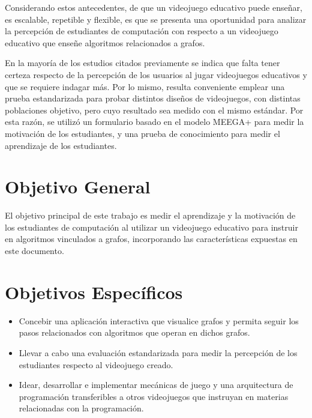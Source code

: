 Considerando estos antecedentes, de que un videojuego educativo puede enseñar, es escalable, repetible y flexible, es que se presenta una oportunidad para analizar la percepción de estudiantes de computación con respecto a un videojuego educativo que enseñe algoritmos relacionados a grafos.

En la mayoría de los estudios citados previamente se indica que falta tener certeza respecto de la percepción de los usuarios al jugar videojuegos educativos y que se requiere indagar más. Por lo mismo, resulta conveniente emplear una prueba estandarizada para probar distintos diseños de videojuegos, con distintas poblaciones objetivo, pero cuyo resultado sea medido con el mismo estándar. Por esta razón, se utilizó un formulario basado en el modelo MEEGA+ \cite{meegaplus} para medir la motivación de los estudiantes, y una prueba de conocimiento para medir el aprendizaje de los estudiantes.




\section{Objetivo General}

El objetivo principal de este trabajo es medir el aprendizaje y la motivación de los estudiantes de computación al utilizar un videojuego educativo para instruir en algoritmos vinculados a grafos, incorporando las características expuestas en este documento.


\section{Objetivos Específicos}

\begin{itemize}

\item Concebir una aplicación interactiva que visualice grafos y permita seguir los pasos relacionados con algoritmos que operan en dichos grafos.

\item Llevar a cabo una evaluación estandarizada para medir la percepción de los estudiantes respecto al videojuego creado.

\item Idear, desarrollar e implementar mecánicas de juego y una arquitectura de programación transferibles a otros videojuegos que instruyan en materias relacionadas con la programación.


\end{itemize}



